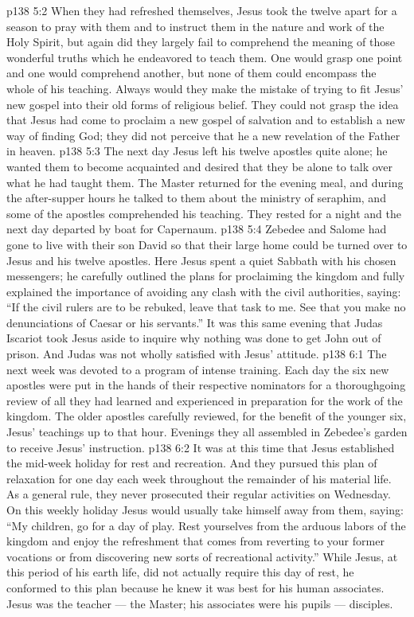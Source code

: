 \vs p138 5:2 \pc When they had refreshed themselves, Jesus took the twelve apart for a season to pray with them and to instruct them in the nature and work of the Holy Spirit, but again did they largely fail to comprehend the meaning of those wonderful truths which he endeavored to teach them. One would grasp one point and one would comprehend another, but none of them could encompass the whole of his teaching. Always would they make the mistake of trying to fit Jesus’ new gospel into their old forms of religious belief. They could not grasp the idea that Jesus had come to proclaim a new gospel of salvation and to establish a new way of finding God; they did not perceive that he  a new revelation of the Father in heaven.
\vs p138 5:3 The next day Jesus left his twelve apostles quite alone; he wanted them to become acquainted and desired that they be alone to talk over what he had taught them. The Master returned for the evening meal, and during the after\hyp{}supper hours he talked to them about the ministry of seraphim, and some of the apostles comprehended his teaching. They rested for a night and the next day departed by boat for Capernaum.
\vs p138 5:4 Zebedee and Salome had gone to live with their son David so that their large home could be turned over to Jesus and his twelve apostles. Here Jesus spent a quiet Sabbath with his chosen messengers; he carefully outlined the plans for proclaiming the kingdom and fully explained the importance of avoiding any clash with the civil authorities, saying: \textcolor{ubdarkred}{“If the civil rulers are to be rebuked, leave that task to me. See that you make no denunciations of Caesar or his servants.”} It was this same evening that Judas Iscariot took Jesus aside to inquire why nothing was done to get John out of prison. And Judas was not wholly satisfied with Jesus’ attitude.
\vs p138 6:1 The next week was devoted to a program of intense training. Each day the six new apostles were put in the hands of their respective nominators for a thoroughgoing review of all they had learned and experienced in preparation for the work of the kingdom. The older apostles carefully reviewed, for the benefit of the younger six, Jesus’ teachings up to that hour. Evenings they all assembled in Zebedee’s garden to receive Jesus’ instruction.
\vs p138 6:2 It was at this time that Jesus established the mid\hyp{}week holiday for rest and recreation. And they pursued this plan of relaxation for one day each week throughout the remainder of his material life. As a general rule, they never prosecuted their regular activities on Wednesday. On this weekly holiday Jesus would usually take himself away from them, saying: \textcolor{ubdarkred}{“My children, go for a day of play. Rest yourselves from the arduous labors of the kingdom and enjoy the refreshment that comes from reverting to your former vocations or from discovering new sorts of recreational activity.”} While Jesus, at this period of his earth life, did not actually require this day of rest, he conformed to this plan because he knew it was best for his human associates. Jesus was the teacher --- the Master; his associates were his pupils --- disciples.
